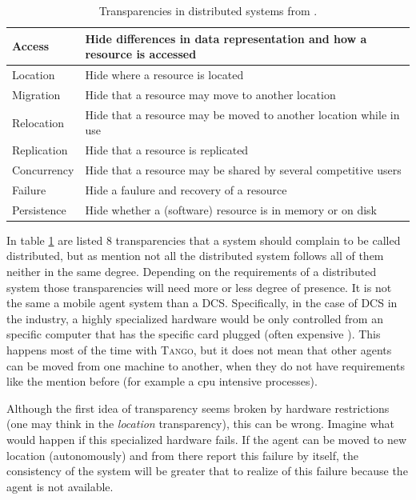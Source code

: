 \documentclass[10pt,a4paper,twoside]{llncs}
\newcommand{\tango}{\textsc{Tango}}
\begin{document}
\begin{table}[h]
    \begin{center}
        \begin{tabular}{|l|l|}
            \hline
            Access & Hide differences in data representation and how a resource is accessed \\ \hline
            Location & Hide where a resource is located \\ \hline
            Migration & Hide that a resource may move to another location \\ \hline
            Relocation & Hide that a resource may be moved to another location while in use \\ \hline
            Replication & Hide that a resource is replicated \\ \hline
            Concurrency & Hide that a resource may be shared by several competitive users \\ \hline
            Failure & Hide a faulure and recovery of a resource \\ \hline
            Persistence & Hide whether a (software) resource is in memory or on disk \\ \hline
        \end{tabular}
        \caption{Transparencies in distributed systems from \cite{TanenbaumDistr}.}\label{tab:transparencies}
    \end{center}
\end{table}

In table \ref{tab:transparencies} are listed 8 transparencies that a system should complain to be called distributed, but as mention not all the distributed system follows all of them neither in the same degree. Depending on the requirements of a distributed system those transparencies will need more or less degree of presence. It is not the same a mobile agent system than a DCS. Specifically, in the case of DCS in the industry, a highly specialized hardware would be only controlled from an specific computer that has the specific card plugged (often expensive	). This happens most of the time with \tango, but it does not mean that other agents can be moved from one machine to another, when they do not have requirements like the mention before (for example a cpu intensive processes).

Although the first idea of transparency seems broken by hardware restrictions (one may think in the \emph{location} transparency), this can be wrong. Imagine what would happen if this specialized hardware fails. If the agent can be moved to new location (autonomously) and from there report this failure by itself, the consistency of the system will be greater that to realize of this failure because the agent is not available.
\end{document}
